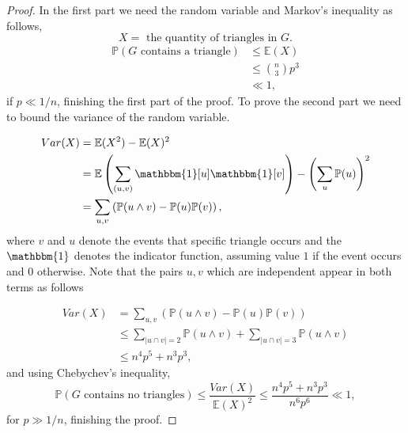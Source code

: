 \documentclass[12pt,twoside,a4paper,bibliography=totocnumbered]{book}
\numberwithin{equation}{section}
\theoremstyle{remark}
\begin{document}
\begin{proof}
In the first part we need the random variable and  Markov's inequality as follows,
$$ X = \text{ the quantity of triangles in } G.$$
\begin{align*}
\mathbb{P}(G\text{ contains a triangle}) &\leq \mathbb{E}(X)\\
& \leq \binom{n}{3}p^3 \\
& \ll 1,
\end{align*}
if $ p \ll 1/n$, finishing the first part of the proof. To prove the second part we need to bound the variance of the random variable.

\begin{align*}
Var(X) &= \mathbb{E}(X^2) - \mathbb{E}(X)^2\\
& = \mathbb{E} \left( \sum_{(u, v)} \mathbbm{1}[u]\mathbbm{1}[v] \right) - \left( \sum_u \mathbb{P}(u) \right) ^2\\
& = \sum_{u,v} \left(\mathbb{P}(u \wedge v) - \mathbb{P}(u)\mathbb{P}(v)\right),
\end{align*}
where $v$ and $u$ denote the events that specific triangle occurs and the $\mathbbm{1}$ denotes the indicator function, assuming value $1$ if the event occurs and $0$ otherwise. Note that the pairs $u,v$ which are independent appear in both terms as follows

\begin{align*}
Var(X) &= \sum_{u,v} \left(\mathbb{P}(u \wedge v) - \mathbb{P}(u)\mathbb{P}(v)\right)\\
& \leq \sum_{|u \cap v| = 2}\mathbb{P}(u \wedge v) + \sum_{|u \cap v| = 3}\mathbb{P}(u \wedge v)\\
&\leq n^4 p^5 + n^3 p^3,
\end{align*}
and using Chebychev's inequality,
$$\mathbb{P}(G \text{ contains no triangles}) \leq \frac{Var(X)}{\mathbb{E}(X)^2} \leq \frac{n^4p^5 + n^3p^3 }{n^6p^6} \ll 1,$$
for $p \gg 1/n$, finishing the proof.
 \end{proof}
\end{document}
